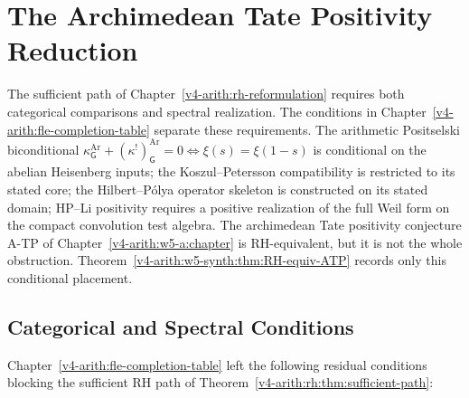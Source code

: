 \chapter{The Archimedean Tate Positivity Reduction}
\label{v4-arith:w5-synth:chapter}

The sufficient path of Chapter~\ref{v4-arith:rh-reformulation}
requires both categorical comparisons and spectral realization.
The conditions in Chapter~\ref{v4-arith:fle-completion-table}
separate these requirements. The arithmetic
Positselski biconditional
\(\kappa^{\mathrm{Ar}}_{\mathsf{G}}+(\kappa^{!})^{\mathrm{Ar}}_{\mathsf{G}}=0
\Leftrightarrow \xi(s)=\xi(1-s)\)
is conditional on the abelian Heisenberg inputs; the
Koszul--Petersson compatibility is restricted to its stated core; the
Hilbert--P\'{o}lya operator skeleton is constructed on its stated
domain; HP--Li positivity requires a positive realization of the full
Weil form on the compact convolution test algebra.  The
archimedean Tate positivity conjecture A-TP of
Chapter~\ref{v4-arith:w5-a:chapter} is RH-equivalent, but it is not
the whole obstruction.
Theorem~\ref{v4-arith:w5-synth:thm:RH-equiv-ATP} records only this
conditional placement.

\section{Categorical and Spectral Conditions}
\label{v4-arith:w5-synth:domain}

Chapter~\ref{v4-arith:fle-completion-table} left the following
residual conditions blocking the sufficient RH path of
Theorem~\ref{v4-arith:rh:thm:sufficient-path}:

